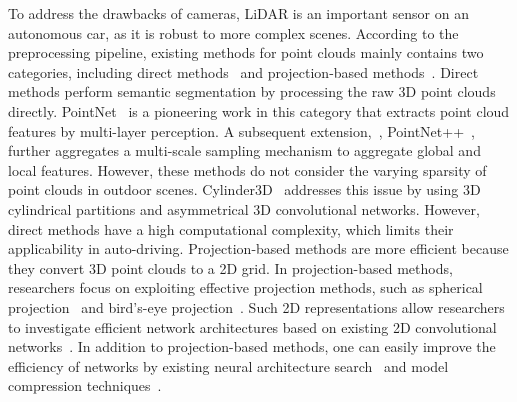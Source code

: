 \documentclass[10pt,twocolumn,letterpaper]{article}
\newcommand{\ice}[1]{{\color{black}#1}}
\begin{document}
\ice{To address the drawbacks of cameras, LiDAR is an important sensor on an autonomous car, as it is robust to more complex scenes. 
According to the preprocessing pipeline, existing methods for point clouds mainly contains two categories, including direct methods~\cite{hu2020randla,qi2017pointnet,qi2017pointnet++,zhu2021cylindrical} and projection-based methods~\cite{cortinhal2020salsanext, wu2018squeezeseg, wu2019squeezesegv2, xu2020squeezesegv3}.
}
Direct methods perform semantic segmentation by processing the raw 3D point clouds directly. PointNet~\cite{qi2017pointnet} is a pioneering work in this category that extracts point cloud features by multi-layer perception. A subsequent extension,~\ie, PointNet++~\cite{qi2017pointnet++}, further aggregates a multi-scale sampling mechanism to aggregate global and local features. However, these methods do not consider the varying sparsity of point clouds in outdoor scenes.
Cylinder3D~\cite{zhu2021cylindrical} addresses this issue by using 3D cylindrical partitions and asymmetrical 3D convolutional networks. However,  direct methods have a high computational complexity, which limits their applicability in auto-driving.
Projection-based methods \ice{are more efficient because they convert 3D point clouds to a 2D grid. 
In projection-based methods, researchers focus on exploiting effective projection methods, such as spherical projection~\cite{milioto2019rangenet++,wu2018squeezeseg} and bird's-eye projection~\cite{zhang2020polarnet}.} Such 2D representations allow researchers to investigate efficient network architectures based on existing 2D convolutional networks~\cite{aksoy2019salsanet,cortinhal2020salsanext,Guo2019NATNA}.
In addition to projection-based methods, one can easily improve the efficiency of networks by existing neural architecture search~\cite{cai2019once,guo2021towards,niu2020disturbance} and model compression techniques~\cite{han2015deep,liu2021discrimination,xu2020generative}.
\end{document}
